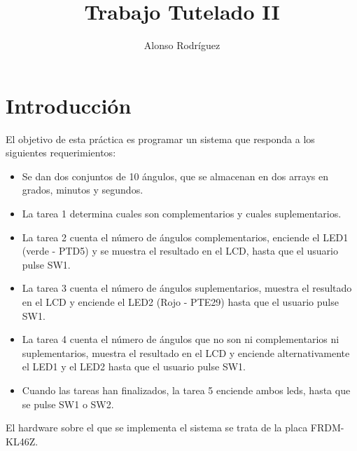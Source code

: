 \documentclass[a4paper,openright,12pt]{article}
\begin{document}
\author {Alonso Rodríguez}
\title {Trabajo Tutelado II}

\maketitle

\justifying{}


\section{Introducción}
El objetivo de esta práctica es programar un sistema que responda a los siguientes requerimientos:
\begin{itemize}    
    \item Se dan dos conjuntos de 10 ángulos, que se almacenan en dos arrays en grados, minutos y segundos.
    \item La tarea 1 determina cuales son complementarios y cuales suplementarios.
    \item La tarea 2 cuenta el número de ángulos complementarios, enciende el LED1 (verde - PTD5) y se muestra el resultado en el LCD, hasta que el usuario pulse SW1.
    \item La tarea 3 cuenta el número de ángulos suplementarios, muestra el resultado en el LCD y enciende el LED2 (Rojo - PTE29) hasta que el usuario pulse SW1.
    \item La tarea 4 cuenta el número de ángulos que no son ni complementarios ni suplementarios, muestra el resultado en el LCD y enciende alternativamente el LED1 y el LED2
          hasta que el usuario pulse SW1.
    \item Cuando las tareas han finalizados, la tarea 5 enciende ambos leds, hasta que se pulse SW1 o SW2.
\end{itemize}

El hardware sobre el que se implementa el sistema se trata de la placa FRDM-KL46Z.



\clearpage
\end{document}
